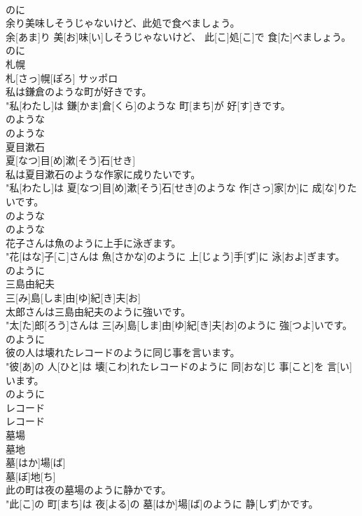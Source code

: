 \documentclass[8pt]{extreport}
\begin{document}
\begin{CJK}{UTF8}{min}
\\	のに 
\\	余り美味しそうじゃないけど、此処で食べましょう。	
\\	余[あま]り 美[お]味[い]しそうじゃないけど、 此[こ]処[こ]で 食[た]べましょう。 
\\	のに 
\\	札幌	
\\	札[さっ]幌[ぽろ]	サッポロ
\\	私は鎌倉のような町が好きです。	
\\	"私[わたし]は 鎌[かま]倉[くら]のような 町[まち]が 好[す]きです。 
\\	のような 
\\	のような 
\\	夏目漱石	
\\	夏[なつ]目[め]漱[そう]石[せき]	
\\	私は夏目漱石のような作家に成りたいです。	
\\	"私[わたし]は 夏[なつ]目[め]漱[そう]石[せき]のような 作[さっ]家[か]に 成[な]りたいです。 
\\	のような 
\\	のような 
\\	花子さんは魚のように上手に泳ぎます。	
\\	"花[はな]子[こ]さんは 魚[さかな]のように 上[じょう]手[ず]に 泳[およ]ぎます。 
\\	のように
\\	三島由紀夫	
\\	三[み]島[しま]由[ゆ]紀[き]夫[お]
\\	太郎さんは三島由紀夫のように強いです。	
\\	"太[た]郎[ろう]さんは 三[み]島[しま]由[ゆ]紀[き]夫[お]のように 強[つよ]いです。 
\\	のように
\\	彼の人は壊れたレコードのように同じ事を言います。	
\\	"彼[あ]の 人[ひと]は 壊[こわ]れたレコードのように 同[おな]じ 事[こと]を 言[い]います。 
\\	のように
\\	レコード	
\\	レコード
\\	墓場 
\\	墓地	
\\	墓[はか]場[ば] 
\\	墓[ぼ]地[ち]	
\\	此の町は夜の墓場のように静かです。	
\\	"此[こ]の 町[まち]は 夜[よる]の 墓[はか]場[ば]のように 静[しず]かです。 

\end{CJK}
\end{document}
